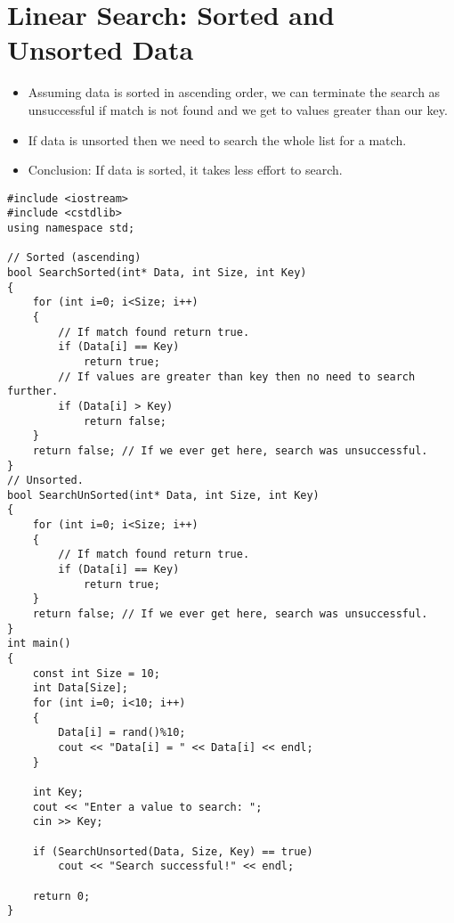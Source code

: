 \documentclass[12pt,a4paper]{article}
\begin{document}
\section{Linear Search: Sorted and Unsorted Data}
\begin{itemize}
\item Assuming data is sorted in ascending order, we can terminate the search as unsuccessful if match is not found and we get to values greater than our key.
\item If data is unsorted then we need to search the whole list for a match.
\item Conclusion: If data is sorted, it takes less effort to search.
\end{itemize}
\begin{lstlisting}[caption={Linear Search for sorted and unsorted data},escapechar=$]
#include <iostream>
#include <cstdlib>
using namespace std;

// Sorted (ascending)
bool SearchSorted(int* Data, int Size, int Key)
{
	for (int i=0; i<Size; i++)
	{
		// If match found return true.
		if (Data[i] == Key)
			return true;
		// If values are greater than key then no need to search further.
		if (Data[i] > Key)
			return false;
	}
	return false; // If we ever get here, search was unsuccessful.
}
// Unsorted.
bool SearchUnSorted(int* Data, int Size, int Key)
{
	for (int i=0; i<Size; i++)
	{
		// If match found return true.
		if (Data[i] == Key)
			return true;
	}
	return false; // If we ever get here, search was unsuccessful.
}
int main()
{
	const int Size = 10;
	int Data[Size];
	for (int i=0; i<10; i++)
	{
		Data[i] = rand()%10;
		cout << "Data[i] = " << Data[i] << endl;
	}

	int Key;
	cout << "Enter a value to search: ";
	cin >> Key;

	if (SearchUnsorted(Data, Size, Key) == true)
		cout << "Search successful!" << endl;

	return 0;
}
\end{lstlisting}
\end{document}
